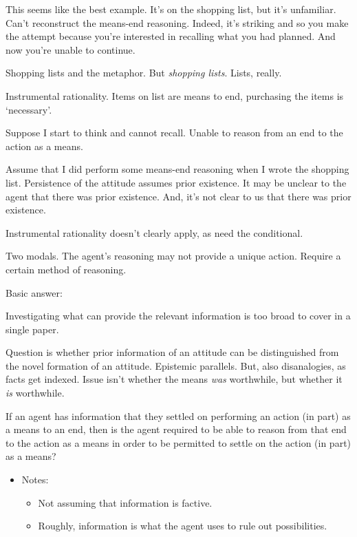 \documentclass[10pt]{article}
\begin{document}
This seems like the best example.
It's on the shopping list, but it's unfamiliar.
Can't reconstruct the means-end reasoning.
Indeed, it's striking and so you make the attempt because you're interested in recalling what you had planned.
And now you're unable to continue.


\newpage

Shopping lists and the metaphor.
But \emph{shopping lists}.
Lists, really.

Instrumental rationality.
Items on list are means to end, purchasing the items is `necessary'.

Suppose I start to think and cannot recall.
Unable to reason from an end to the action as a means.

Assume that I did perform some means-end reasoning when I wrote the shopping list.
Persistence of the attitude assumes prior existence.
It may be unclear to the agent that there was prior existence.
And, it's not clear to us that there was prior existence.

Instrumental rationality doesn't clearly apply, as need the conditional.




Two modals.
The agent's reasoning may not provide a unique action.
Require a certain method of reasoning.

Basic answer:

Investigating what can provide the relevant information is too broad to cover in a single paper.

Question is whether prior information of an attitude can be distinguished from the novel formation of an attitude.
Epistemic parallels.
But, also disanalogies, as facts get indexed.
Issue isn't whether the means \emph{was} worthwhile, but whether it \emph{is} worthwhile.


\newpage

\begin{wodge}
  If an agent has information that they settled on performing an action (in part) as a means to an end, then is the agent required to be able to reason from that end to the action as a means in order to be permitted to settle on the action (in part) as a means?
  \begin{itemize}
  \item Notes:
    \begin{itemize}
    \item Not assuming that information is factive.
    \item Roughly, information is what the agent uses to rule out possibilities.
    \end{itemize}
  \end{itemize}
\end{wodge}
\end{document}
